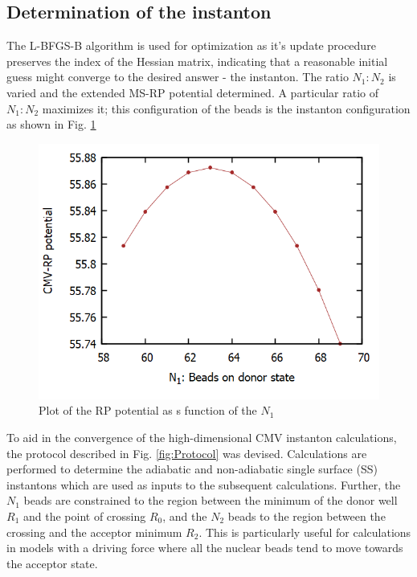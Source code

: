 \documentclass[%
 aip,
 jmp,%
 amsmath,amssymb,
reprint,%
]{revtex4-1}
\begin{document}
\subsection{\label{ssec:level4B} Determination of the instanton}
The L-BFGS-B algorithm is used for optimization as it's update procedure preserves the index of the Hessian matrix, indicating that a reasonable initial guess might converge to the desired answer - the instanton. 
The ratio $N_{1}:N_{2}$ is varied and the extended MS-RP potential determined. A particular ratio of $N_{1}:N_{2}$ maximizes it; this configuration of the beads is the instanton configuration as shown in Fig. \ref{rppesN1N2} 
\begin{figure}[h!]
\centering
\includegraphics[scale=0.38]{MF-action.png} 
\caption{Plot of the RP potential as s function of the $N_{1}$} \label{rppesN1N2}
\end{figure}
To aid in the convergence of the high-dimensional CMV instanton calculations, the protocol described in Fig. \ref{fig:Protocol} was devised. Calculations are performed to determine the adiabatic and non-adiabatic single surface (SS) instantons which are used as inputs to the subsequent calculations. Further, the $N_{1}$ beads are constrained to the region between the minimum of the donor well $R_{1}$ and the point of crossing $R_{0}$, and the $N_{2}$ beads to the region between the crossing and the acceptor minimum $R_{2}$. This is particularly useful for calculations in models with a driving force where all the nuclear beads tend to move towards the acceptor state.
\end{document}
